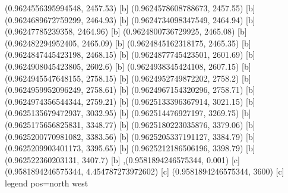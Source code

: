 {{{(0.9624556395994548, 2457.53) [b] 
(0.9624578608788673, 2457.55) [b] 
(0.9624689672759299, 2464.93) [b] 
(0.9624734098347549, 2464.94) [b] 
(0.96247785239358, 2464.96) [b] 
(0.9624800736729925, 2465.08) [b] 
(0.962482294952405, 2465.09) [b] 
(0.9624845162318175, 2465.35) [b] 
(0.9624847445423198, 2468.15) [b] 
(0.9624877745423501, 2601.69) [b] 
(0.9624908045423805, 2602.6) [b] 
(0.9624938345424108, 2607.15) [b] 
(0.9624945547648155, 2758.15) [b] 
(0.9624952749872202, 2758.2) [b] 
(0.9624959952096249, 2758.61) [b] 
(0.9624967154320296, 2758.71) [b] 
(0.9624974356544344, 2759.21) [b] 
(0.9625133396367914, 3021.15) [b] 
(0.9625135679472937, 3032.95) [b] 
(0.962514476927197, 3269.75) [b] 
(0.9625175656825831, 3348.77) [b] 
(0.9625180223035876, 3379.06) [b] 
(0.9625200770981082, 3383.56) [b] 
(0.9625205337191127, 3384.79) [b] 
(0.9625209903401173, 3395.65) [b] 
(0.9625212186506196, 3398.79) [b] 
(0.962522360203131, 3407.7) [b] 
},{(0.9581894246575344, 0.001) [c] 
(0.9581894246575344, 4.454787273972602) [c] 
(0.9581894246575344, 3600) [c] 
}}}{legend pos=north west}
